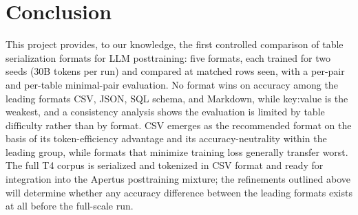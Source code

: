 \documentclass[11pt,a4paper]{article}
\begin{document}
\section{Conclusion}
This project provides, to our knowledge, the first controlled comparison of table serialization formats for LLM posttraining: five formats, each trained for two seeds (30B tokens per run) and compared at matched rows seen, with a per-pair and per-table minimal-pair evaluation. No format wins on accuracy among the leading formats CSV, JSON, SQL schema, and Markdown, while key:value is the weakest, and a consistency analysis shows the evaluation is limited by table difficulty rather than by format. CSV emerges as the recommended format on the basis of its token-efficiency advantage and its accuracy-neutrality within the leading group, while formats that minimize training loss generally transfer worst. The full T4 corpus is serialized and tokenized in CSV format and ready for integration into the Apertus posttraining mixture; the refinements outlined above will determine whether any accuracy difference between the leading formats exists at all before the full-scale run.
\end{document}
